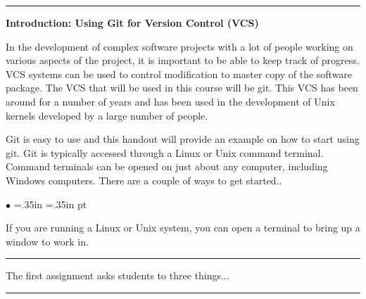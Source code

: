 \documentclass[10pt,fleqn]{article}
\begin{document}
\vskip0.1in\hrule\vskip0.1in
\noindent
{\bf Introduction: Using Git for Version Control (VCS)}

\medskip
\noindent
In the development of complex software projects with a lot of people working on
various aspects of the project, it is important to be able to keep track of
progress. VCS systems can be used to control modification to master copy of the
software package. The VCS that will be used in this course will be git. This VCS
has been around for a number of years and has been used in the development of
Unix kernels developed by a large number of people.

Git is easy to use and this handout will provide an example on how to start
using git. Git is typically accessed through a Linux or Unix command terminal.
Command terminals can be opened on just about any computer, including Windows
computers. There are a couple of ways to get started..
\begin{list}{$\bullet$}{ \parsep=0pt \listparindent=0pt
\topsep=0pt \rightmargin=.35in \leftmargin=.35in  pt
\itemsep=2pt}
  \item If you are running a Linux or Unix system, you can open a terminal to
        bring up a window to work in.
\end{list}
\vskip0.1in\hrule\vskip0.1in
\noindent
The first assignment asks students to three things...
\vskip0.1in\hrule\vskip0.1in
\noindent
\end{document}
